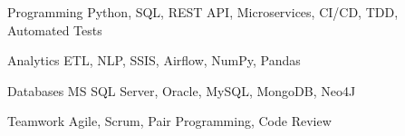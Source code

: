 


\begin{cvskills}


\cvskill
{Programming} %
{Python, SQL, REST API, Microservices, CI/CD, TDD, Automated Tests} %


\cvskill
{Analytics} %
{ETL, NLP, SSIS, Airflow, NumPy, Pandas} %


\cvskill
{Databases} %
{MS SQL Server, Oracle, MySQL, MongoDB, Neo4J} %


\cvskill
{Teamwork} %
{Agile, Scrum, Pair Programming, Code Review} %


\end{cvskills}